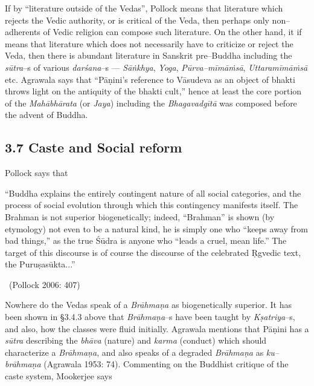 If by “literature outside of the Vedas”, Pollock means that literature which rejects the Vedic authority, or is critical of the Veda, then perhaps only non–adherents of Vedic religion can compose such literature. On the other hand, it if means that literature which does not necessarily have to criticize or reject the Veda, then there is abundant literature in Sanskrit pre–Buddha including the \textit{sūtra}–s of various \textit{darśana}–s — \textit{Sāṅkhya}, \textit{Yoga}, \textit{Pūrva–mīmāṁsā}, \textit{Uttaramīmāṁsā} etc. Agrawala says that “Pāṇini’s reference to Vāsudeva as an object of bhakti throws light on the antiquity of the bhakti cult,” hence at least the core portion of the \textit{Mahābhārata} (or \textit{Jaya}) including the \textit{Bhagavadgītā} was composed before the advent of Buddha.


\subsection*{3.7 Caste and Social reform}

Pollock says that

\begin{myquote}
“Buddha explains the entirely contingent nature of all social categories, and the process of social evolution through which this contingency manifests itself. The Brahman is not superior biogenetically; indeed, “Brahman” is shown (by etymology) not even to be a natural kind, he is simply one who “keeps away from bad things,” as the true Śūdra is anyone who “leads a cruel, mean life.” The target of this discourse is of course the discourse of the celebrated Ṛgvedic text, the Puruṣasūkta...” 

~\hfill (Pollock 2006: 407)
\end{myquote}

Nowhere do the Vedas speak of a \textit{Brāhmaṇa} as biogenetically superior. It has been shown in §3.4.3 above that \textit{Brāhmaṇa}–s have been taught by \textit{Kṣatriya}–s, and also, how the classes were fluid initially. Agrawala mentions that Pāṇini has a \textit{sūtra} describing the \textit{bhāva} (nature) and \textit{karma} (conduct) which should characterize a \textit{Brāhmaṇa}, and also speaks of a degraded \textit{Brāhmaṇa} as \textit{ku–brāhmaṇa} (Agrawala 1953: 74). Commenting on the Buddhist critique of the caste system, Mookerjee says


